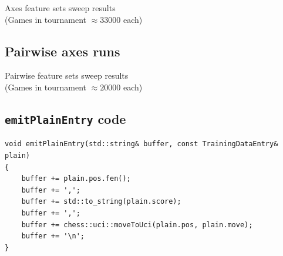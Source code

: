 \begin{table}[H]
\caption{Axes feature sets sweep results\\(Games in tournament $\approx 33000$ each)}
\centering
\begin{adjustbox}{center}

\end{adjustbox}
\end{table}


\newpage
\subsection{Pairwise axes runs}
\label{appendix:pairwise}

\begin{table}[H]
\caption{Pairwise feature sets sweep results\\(Games in tournament $\approx 20000$ each)}
\centering
\begin{adjustbox}{center}

\end{adjustbox}
\end{table}




\newpage
\subsection{\texttt{emitPlainEntry} code}
\label{appendix:emitPlainEntry}

\begin{lstlisting}
void emitPlainEntry(std::string& buffer, const TrainingDataEntry& plain)
{
    buffer += plain.pos.fen();
    buffer += ',';
    buffer += std::to_string(plain.score);
    buffer += ',';
    buffer += chess::uci::moveToUci(plain.pos, plain.move);
    buffer += '\n';
}
\end{lstlisting}

